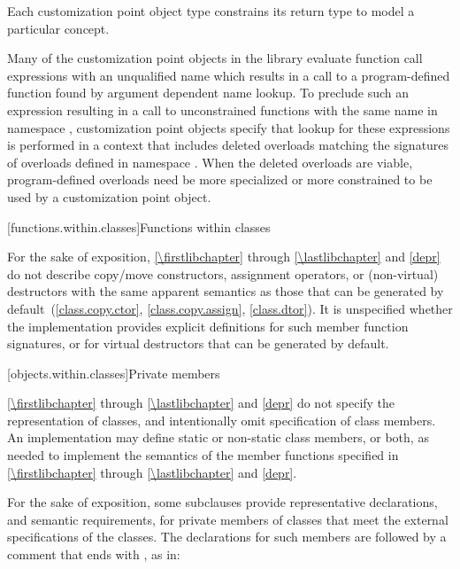 \pnum
Each customization point object type constrains its return type to model a
particular concept.

\pnum
\begin{note}
Many of the customization point objects in the library evaluate function call
expressions with an unqualified name which results in a call to a
program-defined function found by argument dependent name
lookup. To preclude such an expression resulting in a
call to unconstrained functions with the same name in namespace ,
customization point objects specify that lookup for these expressions is
performed in a context that includes deleted overloads matching the signatures
of overloads defined in namespace . When the deleted overloads are
viable, program-defined overloads need be more specialized
or more constrained to be used by a customization point
object.
\end{note}

[functions.within.classes]{Functions within classes}

\pnum
For the sake of exposition, \ref{\firstlibchapter} through \ref{\lastlibchapter}
and \ref{depr} do not describe copy/move constructors, assignment
operators, or (non-virtual) destructors with the same apparent
semantics as those that can be generated
by default~(\ref{class.copy.ctor}, \ref{class.copy.assign}, \ref{class.dtor}).
%
%
%
It is unspecified whether
the implementation provides explicit definitions for such member function
signatures, or for virtual destructors that can be generated by default.

[objects.within.classes]{Private members}

\pnum
\ref{\firstlibchapter} through \ref{\lastlibchapter} and
\ref{depr} do not specify the representation of classes, and intentionally
omit specification of class members. An implementation may
define static or non-static class members, or both, as needed to implement the
semantics of the member functions specified in \ref{\firstlibchapter}
through \ref{\lastlibchapter} and \ref{depr}.

\pnum
For the sake of exposition,
some subclauses provide representative declarations, and semantic requirements, for
private members of classes that meet the external specifications of the classes.
The declarations for such members are
followed by a comment that ends with \expos, as in:

